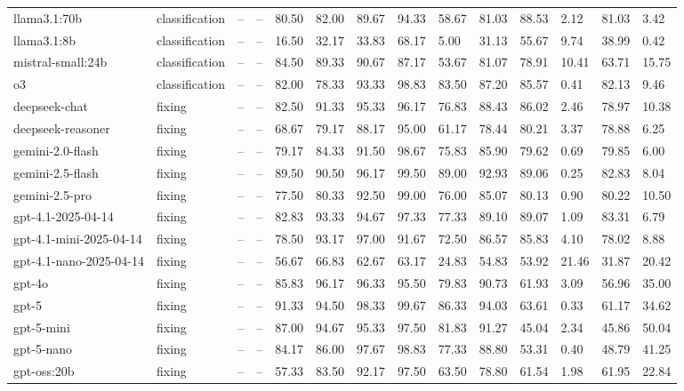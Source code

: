 \begin{table}[!t]
\begin{tabular}{llllllllllllll}
llama3.1:70b & classification & -- & -- & 80.50 & 82.00 & 89.67 & 94.33 & 58.67 & 81.03 & 88.53 & 2.12 & 81.03 & 3.42 \\
llama3.1:8b & classification & -- & -- & 16.50 & 32.17 & 33.83 & 68.17 & 5.00 & 31.13 & 55.67 & 9.74 & 38.99 & 0.42 \\
mistral-small:24b & classification & -- & -- & 84.50 & 89.33 & 90.67 & 87.17 & 53.67 & 81.07 & 78.91 & 10.41 & 63.71 & 15.75 \\
o3 & classification & -- & -- & 82.00 & 78.33 & 93.33 & 98.83 & 83.50 & 87.20 & 85.57 & 0.41 & 82.13 & 9.46 \\
deepseek-chat & fixing & -- & -- & 82.50 & 91.33 & 95.33 & 96.17 & 76.83 & 88.43 & 86.02 & 2.46 & 78.97 & 10.38 \\
deepseek-reasoner & fixing & -- & -- & 68.67 & 79.17 & 88.17 & 95.00 & 61.17 & 78.44 & 80.21 & 3.37 & 78.88 & 6.25 \\
gemini-2.0-flash & fixing & -- & -- & 79.17 & 84.33 & 91.50 & 98.67 & 75.83 & 85.90 & 79.62 & 0.69 & 79.85 & 6.00 \\
gemini-2.5-flash & fixing & -- & -- & 89.50 & 90.50 & 96.17 & 99.50 & 89.00 & 92.93 & 89.06 & 0.25 & 82.83 & 8.04 \\
gemini-2.5-pro & fixing & -- & -- & 77.50 & 80.33 & 92.50 & 99.00 & 76.00 & 85.07 & 80.13 & 0.90 & 80.22 & 10.50 \\
gpt-4.1-2025-04-14 & fixing & -- & -- & 82.83 & 93.33 & 94.67 & 97.33 & 77.33 & 89.10 & 89.07 & 1.09 & 83.31 & 6.79 \\
gpt-4.1-mini-2025-04-14 & fixing & -- & -- & 78.50 & 93.17 & 97.00 & 91.67 & 72.50 & 86.57 & 85.83 & 4.10 & 78.02 & 8.88 \\
gpt-4.1-nano-2025-04-14 & fixing & -- & -- & 56.67 & 66.83 & 62.67 & 63.17 & 24.83 & 54.83 & 53.92 & 21.46 & 31.87 & 20.42 \\
gpt-4o & fixing & -- & -- & 85.83 & 96.17 & 96.33 & 95.50 & 79.83 & 90.73 & 61.93 & 3.09 & 56.96 & 35.00 \\
gpt-5 & fixing & -- & -- & 91.33 & 94.50 & 98.33 & 99.67 & 86.33 & 94.03 & 63.61 & 0.33 & 61.17 & 34.62 \\
gpt-5-mini & fixing & -- & -- & 87.00 & 94.67 & 95.33 & 97.50 & 81.83 & 91.27 & 45.04 & 2.34 & 45.86 & 50.04 \\
gpt-5-nano & fixing & -- & -- & 84.17 & 86.00 & 97.67 & 98.83 & 77.33 & 88.80 & 53.31 & 0.40 & 48.79 & 41.25 \\
gpt-oss:20b & fixing & -- & -- & 57.33 & 83.50 & 92.17 & 97.50 & 63.50 & 78.80 & 61.54 & 1.98 & 61.95 & 22.84 \\

\end{tabular}
\end{table}
